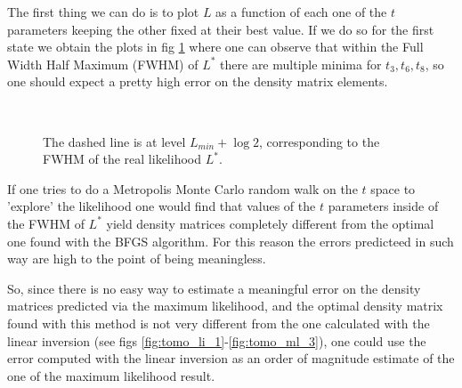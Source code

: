 \documentclass[a4paper, 11pt]{article}
\begin{document}
        The first thing we can do is to plot $L$ as a function of each one of the $t$ parameters keeping the other fixed at their best value.
        If we do so for the first state we obtain the plots in fig \ref{fig:tomo_ml_1_t} where one can observe that within the Full Width Half Maximum (FWHM) of $L^*$ there are multiple minima for $t_3, t_6, t_8$, so one should expect a pretty high error on the density matrix elements.

        \begin{figure}[H]
          \centering
          \\
          \caption{The dashed line is at level $L_{min} + \log{2}$, corresponding to the FWHM of the real likelihood $L^*$.}
          \label{fig:tomo_ml_1_t}
        \end{figure}

        If one tries to do a Metropolis Monte Carlo random walk on the $t$ space to 'explore' the likelihood one would find that values of the $t$ parameters inside of the FWHM of $L^*$ yield density matrices completely different from the optimal one found with the BFGS algorithm. For this reason the errors predicteed in such way are high to the point of being meaningless.

        So, since there is no easy way to estimate a meaningful error on the density matrices predicted via the maximum likelihood, and the optimal density matrix found with this method is not very different from the one calculated with the linear inversion (see figs \ref{fig:tomo_li_1}-\ref{fig:tomo_ml_3}), one could use the error computed with the linear inversion as an order of magnitude estimate of the one of the maximum likelihood result.
\end{document}
